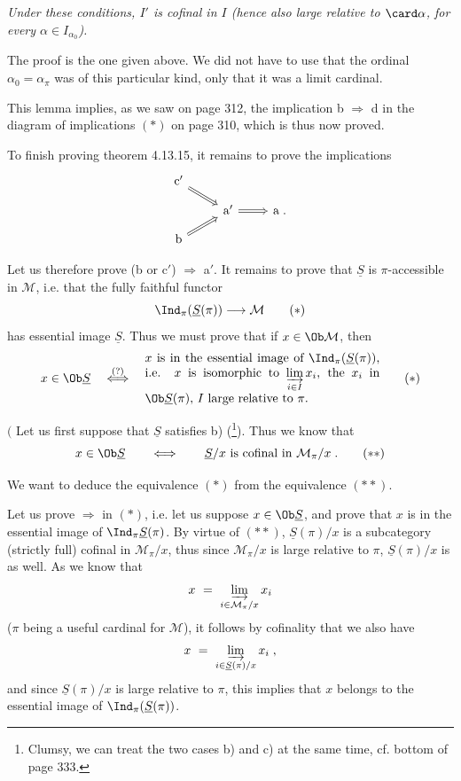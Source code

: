\textit{Under these conditions, $I'$ is cofinal in $I$ (hence also large relative to $\card\alpha$, for every $\alpha \in I_{\alpha_0}$).}

The proof is the one given above. We did not have to use that the ordinal $\alpha_0 = \alpha_\pi$ was of this particular kind, only that it was a limit cardinal.



This lemma implies, as we saw on page 312, the implication b $\Longrightarrow$ d in the diagram of implications $(*)$ on page 310, which is thus now proved.

To finish proving theorem 4.13.15, it remains to prove the implications
\[
\begin{tikzcd}[row sep=small]
\mathrm{c}' \arrow[dr, Rightarrow] & & \\
& \mathrm{a}' \arrow[r, Rightarrow] & \mathrm{a} \; . \\
\mathrm{b} \arrow[ur, Rightarrow] & &
\end{tikzcd}
\]

Let us therefore prove (b or c$'$) $\Longrightarrow$ a$'$. It remains to prove that $\underline{S}$ is $\pi$-accessible in $\mathcal{M}$, i.e. that the fully faithful functor
\[
\Ind_\pi(\underline{S}(\pi)) \longrightarrow \mathcal{M} \tag*{$(*)$}
\]
has essential image $\underline{S}$. Thus we must prove that if $x \in \Ob\mathcal{M}$, then
\[
x \in \Ob\underline{S} \quad \overset{(?)}{\Longleftrightarrow} \quad
\begin{minipage}[c]{0.55\textwidth}
$x$ is in the essential image of $\Ind_\pi(\underline{S}(\pi))$, i.e. $x$ is isomorphic to $\varinjlim\limits_{i\in I} x_i$, the $x_i$ in $\Ob\underline{S}(\pi)$, $I$ large relative to $\pi$.
\end{minipage}
\tag*{$(*)$}
\]


$\Bigg($ Let us first suppose that $\underline{S}$ satisfies b) (\footnote[141]{Clumsy, we can treat the two cases b) and c) at the same time, cf. bottom of page 333.}). Thus we know that
\[
x \in \Ob\underline{S} \qquad \Longleftrightarrow \qquad \underline{S}/x \text{ is cofinal in } \mathcal{M}_\pi/x \; . \tag*{$(**)$}
\]

We want to deduce the equivalence $(*)$ from the equivalence $(**)$.

Let us prove $\Longrightarrow$ in $(*)$, i.e. let us suppose $x \in \Ob\underline{S}$, and prove that $x$ is in the essential image of $\Ind_\pi\underline{S}(\pi)$. By virtue of $(**)$, $\underline{S}(\pi)/x$ is a subcategory (strictly full) cofinal in $\mathcal{M}_\pi/x$, thus since $\mathcal{M}_\pi/x$ is large relative to $\pi$, $\underline{S}(\pi)/x$ is as well. As we know that
\[
x \ = \ \varinjlim_{i\in\mathcal{M}_\pi/x} x_i
\]
($\pi$ being a useful cardinal for $\mathcal{M}$), it follows by cofinality that we also have
\[
x \ = \ \varinjlim_{i\in\underline{S}(\pi)/x} x_i \; ,
\]
and since $\underline{S}(\pi)/x$ is large relative to $\pi$, this implies that $x$ belongs to the essential image of $\Ind_\pi(\underline{S}(\pi))$.

